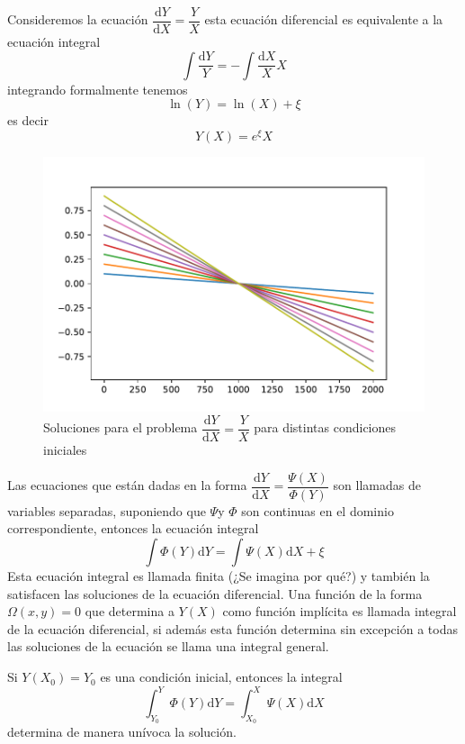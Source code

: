 \begin{ejemplo}
Consideremos la ecuación $\dfrac{\mathrm{d}Y}{\mathrm{d}X}=\dfrac{Y}{X}$ esta ecuación diferencial es equivalente a la ecuación integral 
$$
\int \dfrac{\mathrm{d}Y}{Y} =-\int \dfrac{\mathrm{d}X}{X}X
$$
integrando formalmente tenemos
$$
\ln(Y)=\ln(X)+\xi
$$
es decir
$$
Y(X)=e^{\xi}X
$$
\begin{figure}[H]
    \centering
    \includegraphics[scale=0.85]{ejemplo2.pdf}
    \caption{Soluciones para el problema $\dfrac{\mathrm{d}Y}{\mathrm{d}X}=\dfrac{Y}{X}$ para distintas condiciones iniciales}
    \label{fig:ej2}
\end{figure}
\end{ejemplo}
 
 Las ecuaciones que están dadas en la forma $\dfrac{\mathrm{d}Y}{\mathrm{d}X}=\dfrac{\Psi(X)}{\Phi(Y)}$ son llamadas de variables separadas, suponiendo que $\Psi$y $\Phi$ son continuas en el dominio correspondiente, entonces la ecuación integral
 $$
 \int\Phi(Y)\mathrm{d}Y=\int\Psi(X)\mathrm{d}X+\xi
 $$
 Esta ecuación integral es llamada finita (¿Se imagina por qué?) y también la satisfacen las soluciones de la ecuación diferencial. Una función de la forma $\Omega(x,y)=0$ que determina a $Y(X)$ como función implícita es llamada integral de la ecuación diferencial, si además esta función determina sin excepción  a todas las soluciones de la ecuación se llama una integral general.
 
 Si $Y(X_0)=Y_0$ es una condición inicial, entonces la integral
 $$
 \int_{Y_0}^{Y}\Phi(Y)\mathrm{d}Y=\int_{X_0}^{X}\Psi(X)\mathrm{d}X
 $$
determina de manera unívoca la solución.

